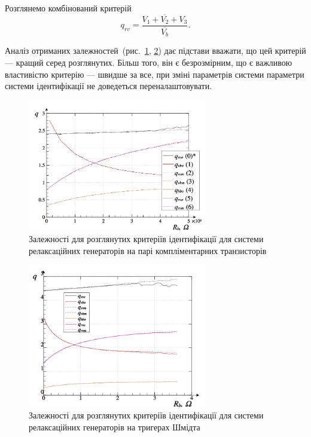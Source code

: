 Розглянемо комбінований критерій
%
\begin{equation}
  q_{rv} = \frac{\overline{V_1+V_2+V_3}}{\overline{V_b}}.
  \label{atu:eq:q_rv_relax}
\end{equation}


Аналіз отриманих залежностей~(рис.~\ref{atu:f:relax3d_q}, \ref{atu:f:relax3ds_q})
дає підстави вважати, що цей критерій --- кращий серед
розглянутих. Більш того, він є безрозмірним, що є важливою
властивістю критерію --- швидше за все, при зміні параметрів
системи параметри системи ідентифікації не
доведеться переналаштовувати.

\begin{figure}[htb!]
  \centerline{\includegraphics[width=0.7\textwidth]{p/relax3d_read_q-p_q1.png} }
  \caption{Залежності для розглянутих критеріїв ідентифікації для системи релаксаційних генераторів на парі компліментарних транзисторів}
  \label{atu:f:relax3d_q}
\end{figure}

\begin{figure}[htb!]
  \centerline{\includegraphics[width=0.7\textwidth]{p/relax3ds_read_q-p_q1.png} }
\caption{Залежності для розглянутих критеріїв ідентифікації для системи релаксаційних генераторів на тригерах Шмідта}
  \label{atu:f:relax3ds_q}
\end{figure}

